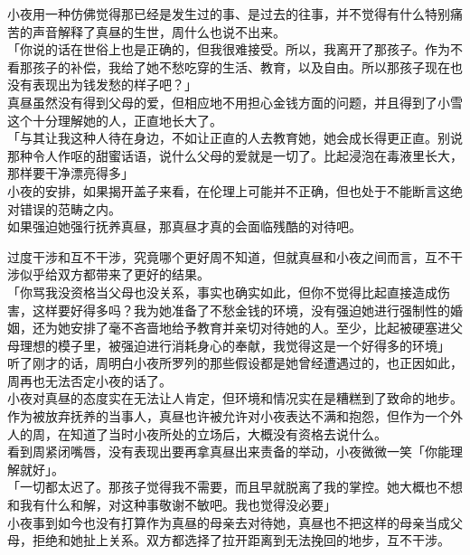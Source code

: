 小夜用一种仿佛觉得那已经是发生过的事、是过去的往事，并不觉得有什么特别痛苦的声音解释了真昼的生世，周什么也说不出来。\\

「你说的话在世俗上也是正确的，但我很难接受。所以，我离开了那孩子。作为不看那孩子的补偿，我给了她不愁吃穿的生活、教育，以及自由。所以那孩子现在也没有表现出为钱发愁的样子吧？」\\

真昼虽然没有得到父母的爱，但相应地不用担心金钱方面的问题，并且得到了小雪这个十分理解她的人，正直地长大了。\\

「与其让我这种人待在身边，不如让正直的人去教育她，她会成长得更正直。别说那种令人作呕的甜蜜话语，说什么父母的爱就是一切了。比起浸泡在毒液里长大，那样要干净漂亮得多」\\

小夜的安排，如果揭开盖子来看，在伦理上可能并不正确，但也处于不能断言这绝对错误的范畴之内。\\

如果强迫她强行抚养真昼，那真昼才真的会面临残酷的对待吧。

过度干涉和互不干涉，究竟哪个更好周不知道，但就真昼和小夜之间而言，互不干涉似乎给双方都带来了更好的结果。\\

「你骂我没资格当父母也没关系，事实也确实如此，但你不觉得比起直接造成伤害，这样要好得多吗？我为她准备了不愁金钱的环境，没有强迫她进行强制性的婚姻，还为她安排了毫不吝啬地给予教育并亲切对待她的人。至少，比起被硬塞进父母理想的模子里，被强迫进行消耗身心的奉献，我觉得这是一个好得多的环境」\\

听了刚才的话，周明白小夜所罗列的那些假设都是她曾经遭遇过的，也正因如此，周再也无法否定小夜的话了。\\

小夜对真昼的态度实在无法让人肯定，但环境和情况实在是糟糕到了致命的地步。作为被放弃抚养的当事人，真昼也许被允许对小夜表达不满和抱怨，但作为一个外人的周，在知道了当时小夜所处的立场后，大概没有资格去说什么。\\

看到周紧闭嘴唇，没有表现出要再拿真昼出来责备的举动，小夜微微一笑「你能理解就好」。\\

「一切都太迟了。那孩子觉得我不需要，而且早就脱离了我的掌控。她大概也不想和我有什么和解，对这种事敬谢不敏吧。我也觉得没必要」\\

小夜事到如今也没有打算作为真昼的母亲去对待她，真昼也不把这样的母亲当成父母，拒绝和她扯上关系。双方都选择了拉开距离到无法挽回的地步，互不干涉。

